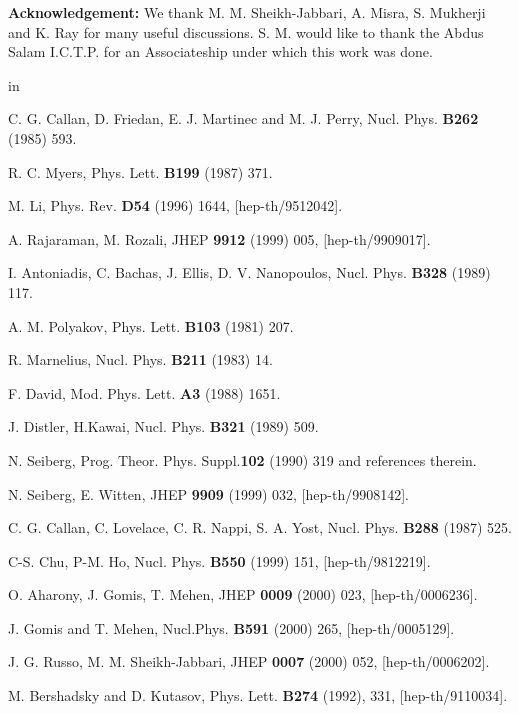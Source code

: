 \documentclass[a4paper,12pt]{article}
\begin{document}
{\bf Acknowledgement: } We thank M. M. Sheikh-Jabbari, A. Misra,
S. Mukherji and K. Ray for many useful discussions. 
S. M. would like to thank the Abdus Salam I.C.T.P. for an 
Associateship under which this work was done.



 in
\begin{thebibliography}{99}

C. G. Callan, D. Friedan, E. J. Martinec and 
M. J. Perry, Nucl. Phys. {\bf B262} (1985) 593.

R. C. Myers, Phys. Lett. {\bf B199} (1987) 371.

M. Li, Phys. Rev. {\bf D54} (1996) 1644, [hep-th/9512042].

A. Rajaraman, M. Rozali, JHEP {\bf 9912} (1999) 005,
[hep-th/9909017].

I. Antoniadis, C. Bachas, J. Ellis, D. V. Nanopoulos,
Nucl. Phys. {\bf B328} (1989) 117.

A. M. Polyakov, Phys. Lett. {\bf B103} (1981) 207.

R. Marnelius, Nucl. Phys. {\bf B211} (1983) 14.

F. David, Mod. Phys. Lett. {\bf A3} (1988) 1651.

J. Distler, H.Kawai, Nucl. Phys. {\bf B321} (1989) 509.

N. Seiberg, Prog. Theor. Phys. Suppl.{\bf 102} (1990) 319
and references therein.

N. Seiberg, E. Witten, JHEP {\bf 9909} (1999) 032, 
[hep-th/9908142].

C. G. Callan, C. Lovelace, C. R. Nappi, S. A. Yost, 
         Nucl. Phys. {\bf B288} (1987) 525.

C-S. Chu, P-M. Ho, Nucl. Phys. {\bf B550} (1999) 151, 
                  [hep-th/9812219].

O. Aharony, J. Gomis, T. Mehen, JHEP {\bf 0009} (2000) 023,
[hep-th/0006236].

 J. Gomis and T. Mehen, Nucl.Phys. {\bf B591} (2000) 
265, [hep-th/0005129]. 

J. G. Russo, M. M. Sheikh-Jabbari, JHEP {\bf 0007} 
(2000) 052, [hep-th/0006202].

M. Bershadsky and D. Kutasov, Phys. Lett. 
{\bf B274} (1992), 331, [hep-th/9110034].


\end{thebibliography}
\end{document}
